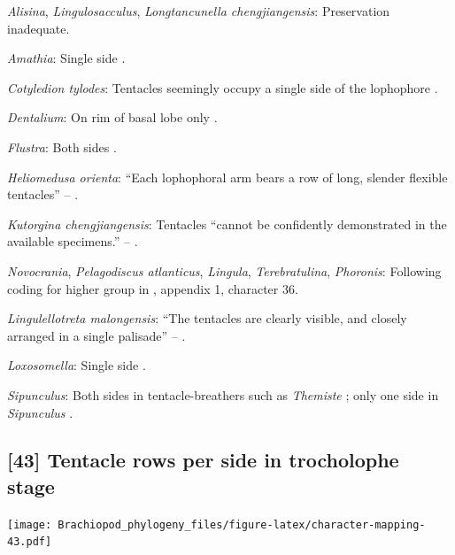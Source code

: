 \documentclass[openany]{book}
\begin{document}
\hypertarget{Alisina-coding-42}{}
\emph{Alisina}, \emph{Lingulosacculus}, \emph{Longtancunella
chengjiangensis}: Preservation inadequate.

\hypertarget{Amathia-coding-42}{}
\emph{Amathia}: Single side \citep{Temereva2016Thenervous}.

\hypertarget{Cotyledion_tylodes-coding-42}{}
\emph{Cotyledion tylodes}: Tentacles seemingly occupy a single side of
the lophophore \citep{Zhang2013}.

\hypertarget{Dentalium-coding-42}{}
\emph{Dentalium}: On rim of basal lobe only \citep{Morton1959}.

\hypertarget{Flustra-coding-42}{}
\emph{Flustra}: Both sides \citep{Schwaha2015, Shunkina2015}.

\hypertarget{Heliomedusa_orienta-coding-42}{}
\emph{Heliomedusa orienta}: ``Each lophophoral arm bears a row of long,
slender flexible tentacles'' -- \citet{Zhang2009Architectureand}.

\hypertarget{Kutorgina_chengjiangensis-coding-42}{}
\emph{Kutorgina chengjiangensis}: Tentacles ``cannot be confidently
demonstrated in the available specimens.'' --
\citet{Zhang2007Rhynchonelliformeanbrachiopods}.

\hypertarget{Lingula-coding-42}{}
\emph{Novocrania}, \emph{Pelagodiscus atlanticus}, \emph{Lingula},
\emph{Terebratulina}, \emph{Phoronis}: Following coding for higher group
in \citet{Carlson1995Phylogeneticrelationships}, appendix 1, character
36.

\hypertarget{Lingulellotreta_malongensis-coding-42}{}
\emph{Lingulellotreta malongensis}: ``The tentacles are clearly visible,
and closely arranged in a single palisade'' -- \citet{Zhang2004Newdata}.

\hypertarget{Loxosomella-coding-42}{}
\emph{Loxosomella}: Single side \citep{Nielsen1966}.

\hypertarget{Sipunculus-coding-42}{}
\emph{Sipunculus}: Both sides in tentacle-breathers such as
\emph{Themiste} \citep{Ruppert1995, Adrianov2006}; only one side in
\emph{Sipunculus} \citep{Ruppert1995, Adrianov2006}.

\subsection*{{[}43{]} Tentacle rows per side in trocholophe
stage}\label{tentacle-rows-per-side-in-trocholophe-stage}

\texttt{[image: Brachiopod\_phylogeny\_files/figure-latex/character-mapping-43.pdf]}
\end{document}

